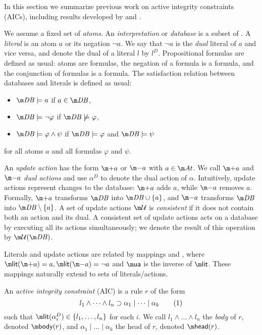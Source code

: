 In this section we summarize previous work on active integrity constraints (AICs), including results developed by \citet{ppdp/FlescaGZ04,iclp/CaropreseGSZ06,tplp/CaropreseT11} and \citet{tase/Cruz-FilipeEGN13}.

We assume a fixed set \atoms of \emph{atoms}. An \emph{interpretation} or \emph{database} is a subset of \atoms. A \emph{literal} is an atom $a$ or its negation $\lnot a$. 
We say that $\lnot a$ is the \emph{dual} literal of $a$ and vice versa, and denote the dual of a literal $l$ by $l^D$. 
Propositional formulas are defined as usual: atoms are formulas, the negation of a formula is a formula, and the conjunction of formulas is a formula. 
The satisfaction relation between databases \db and literals is defined as usual: 
\begin{itemize}
 \item $\db \models a$ if $a\in\db$,
 \item $\db \models \lnot \varphi$ if $\db\not\models \varphi$,
 \item $\db \models \varphi\land\psi$ if $\db\models \varphi$ and $\db \models \psi$
\end{itemize}
for all atoms $a$ and all formulas $\varphi$ and $\psi$.

An \emph{update action} has the form $\add a$ or $\remove a$ with $a\in \atoms$. We call $\add a$ and $\remove a$ \emph{dual actions} and use $\alpha^D$ to denote the dual action of $\alpha$. 
Intuitively, update actions represent changes to the database: $\add a$ adds $a$, while $\remove a$ removes $a$. Formally, $\add a$ transforms $\db$ into $\db\cup\{a\}$, and $\remove a $ transforms $\db$ into $\db\setminus\{a\}$.
A set of update actions $\UU$ is \emph{consistent} if it does not contain both an action and its dual. A consistent set of update actions \UU acts on a database \db by executing all its actions simultaneously; we denote the result of this operation by $\UU(\db)$. 

Literals and update actions are related by mappings \litof and \actof, where $\litof(\add a)= a, \litof(\remove a) = \lnot a$ and $\actof$ is the inverse of $\litof$.
These mappings naturally extend to sets of literals/actions. 

\begin{definition}
 An \emph{active integrity constraint} (AIC) is a rule $r$ of the form
  \begin{equation} l_1\land \dots\land l_n\supset \alpha_1\mid\dots \mid \alpha_k \tag{1}\label{eq:aic}\end{equation}
  such that $\litof(\alpha_i^D) \in \{l_1,\dots,l_n\}$ for each $i$.
%  
  We call $l_1\land \dots \land l_n$ the \emph{body} of $r$, denoted $\body(r)$, and $\alpha_1\mid\dots \mid \alpha_k$ the head of $r$, denoted $\head (r)$.
\end{definition}

